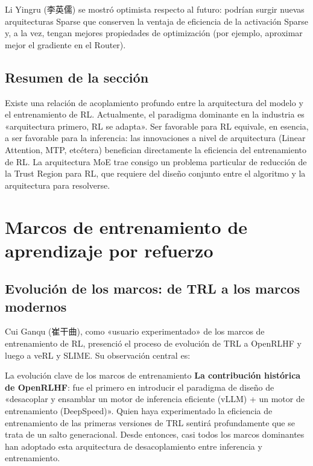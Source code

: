 \documentclass[a4paper]{article}
\begin{document}
Li Yingru (李英儒) se mostró optimista respecto al futuro: podrían surgir nuevas arquitecturas Sparse que conserven la ventaja de eficiencia de la activación Sparse y, a la vez, tengan mejores propiedades de optimización (por ejemplo, aproximar mejor el gradiente en el Router).

\subsection{Resumen de la sección}

Existe una relación de acoplamiento profundo entre la arquitectura del modelo y el entrenamiento de RL. Actualmente, el paradigma dominante en la industria es «arquitectura primero, RL se adapta». Ser favorable para RL equivale, en esencia, a ser favorable para la inferencia: las innovaciones a nivel de arquitectura (Linear Attention, MTP, etcétera) benefician directamente la eficiencia del entrenamiento de RL. La arquitectura MoE trae consigo un problema particular de reducción de la Trust Region para RL, que requiere del diseño conjunto entre el algoritmo y la arquitectura para resolverse.
\section{Marcos de entrenamiento de aprendizaje por refuerzo}

\subsection{Evolución de los marcos: de TRL a los marcos modernos}

Cui Ganqu (崔干曲), como «usuario experimentado» de los marcos de entrenamiento de RL, presenció el proceso de evolución de TRL a OpenRLHF y luego a veRL y SLIME. Su observación central es:

\begin{importantbox}{La evolución clave de los marcos de entrenamiento}
\textbf{La contribución histórica de OpenRLHF}: fue el primero en introducir el paradigma de diseño de «desacoplar y ensamblar un motor de inferencia eficiente (vLLM) + un motor de entrenamiento (DeepSpeed)». Quien haya experimentado la eficiencia de entrenamiento de las primeras versiones de TRL sentirá profundamente que se trata de un salto generacional. Desde entonces, casi todos los marcos dominantes han adoptado esta arquitectura de desacoplamiento entre inferencia y entrenamiento.
\end{importantbox}
\end{document}
